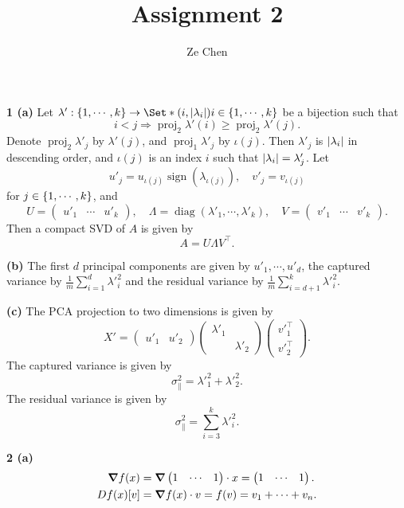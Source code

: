 \documentclass{article}
\title{Assignment 2}
\author{Ze Chen}
\makeatletter
\newcommand*{\shifttext}[1]{%
  \settowidth{\@tempdima}{#1}%
  \hspace{-\@tempdima}#1%
}
\newcommand{\plabel}[1]{%
\shifttext{\textbf{#1}\quad}%
}
\newcommand{\prule}{%
\begin{center}%
\hdashrule[0.5ex]{.99\linewidth}{1pt}{1pt 2.5pt}%
\end{center}%
}
\newcommand{\minusbaseline}{\abovedisplayskip=0pt\abovedisplayshortskip=0pt~\vspace*{-\baselineskip}}%
\makeatother
\begin{document}
\maketitle

% 
% 

\plabel{1 (a)}%
Let $\lambda': \qty{1,\cdots,k} \rightarrow \Set*{(i,\abs{\lambda_i})}{i\in \qty{1,\cdots,k}}$ be a bijection such that
\[ i < j \Rightarrow \operatorname{proj}_2 \lambda'(i) \ge \operatorname{proj}_2 \lambda'(j). \]
Denote $\operatorname{proj}_2 \lambda'_j$ by $\lambda'(j)$, and $\operatorname{proj}_1 \lambda'_j$ by $\iota(j)$.
Then $\lambda'_j$ is $\abs{\lambda_i}$ in descending order, and $\iota(j)$ is an index $i$ such that $\abs{\lambda_i} = \lambda'_j$. Let
\[ u'_j = u_{\iota(j)} \operatorname{sign}(\lambda_{\iota(j)}),\quad v'_j = v_{\iota(j)} \]
for $j\in\qty{1,\cdots,k}$, and
\[ U = \begin{pmatrix}
    u'_1 & \cdots & u'_k
\end{pmatrix},\quad \Lambda = \operatorname{diag}(\lambda'_1,\cdots,\lambda'_k),\quad V = \begin{pmatrix}
    v'_1 & \cdots & v'_k
\end{pmatrix}. \]
Then a compact SVD of $A$ is given by
\[ A = U \Lambda V^\intercal. \]

\plabel{(b)}%
The first $d$ principal components are given by $u'_1,\cdots,u'_d$, the captured variance by $\displaystyle \frac{1}{m} \sum_{i=1}^d \lambda'^2_i$ and the residual variance by $\displaystyle \frac{1}{m} \sum_{i={d+1}}^k \lambda'^2_i$.

\plabel{(c)}%
The PCA projection to two dimensions is given by
\[ X' = \begin{pmatrix}
    u'_1 & u'_2
\end{pmatrix} \begin{pmatrix}
    \lambda'_1 & \\ & \lambda'_2
\end{pmatrix} \begin{pmatrix}
    v'^\intercal_1 \\ v'^\intercal_2
\end{pmatrix}. \]
The captured variance is given by
\[ \sigma^2_{\parallel} = \lambda'^2_1 + \lambda'^2_2. \]
The residual variance is given by
\[ \sigma^2_{\parallel} = \sum_{i=3}^k \lambda'^2_i. \]

\prule

\plabel{2 (a)}%
\begingroup\minusbaseline%
\begin{align*}
    \grad f(x) &= \grad \begin{pmatrix}
        1 & \cdots & 1
    \end{pmatrix} \cdot x = \begin{pmatrix}
        1 & \cdots & 1
    \end{pmatrix}. \\
    D f(x) [v] &= \grad f(x) \cdot v = f(v) = v_1 + \cdots + v_n.
\end{align*}
\endgroup
\end{document}
